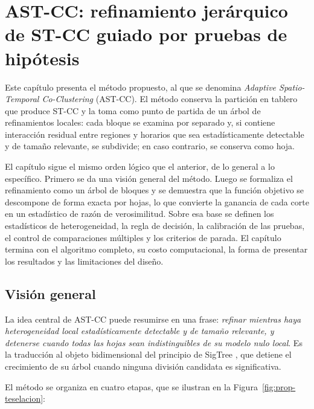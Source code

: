 
\chapter{AST-CC: refinamiento jerárquico de ST-CC guiado por pruebas de hipótesis}\label{chap:propuesta}

Este capítulo presenta el método propuesto, al que se denomina \emph{Adaptive
Spatio-Temporal Co-Clustering} (AST-CC). El método conserva la partición en
tablero que produce ST-CC y la toma como punto de partida de un árbol de
refinamientos locales: cada bloque se examina por separado y, si contiene
interacción residual entre regiones y horarios que sea estadísticamente
detectable y de tamaño relevante, se subdivide; en caso contrario, se conserva
como hoja.

El capítulo sigue el mismo orden lógico que el anterior, de lo general a lo
específico. Primero se da una visión general del método. Luego se formaliza el
refinamiento como un árbol de bloques y se demuestra que la función objetivo se
descompone de forma exacta por hojas, lo que convierte la ganancia de cada corte
en un estadístico de razón de verosimilitud. Sobre esa base se definen los
estadísticos de heterogeneidad, la regla de decisión, la calibración de las
pruebas, el control de comparaciones múltiples y los criterios de parada. El
capítulo termina con el algoritmo completo, su costo computacional, la forma de
presentar los resultados y las limitaciones del diseño.

\section{Visión general}\label{sec:prop-vision}

La idea central de AST-CC puede resumirse en una frase: \emph{refinar mientras
haya heterogeneidad local estadísticamente detectable y de tamaño relevante, y
detenerse cuando todas las hojas sean indistinguibles de su modelo nulo local}.
Es la traducción al objeto bidimensional del principio de SigTree
\cite{Hu2025}, que detiene el crecimiento de su árbol cuando ninguna división
candidata es significativa.

El método se organiza en cuatro etapas, que se ilustran en la
Figura~\ref{fig:prop-teselacion}:

